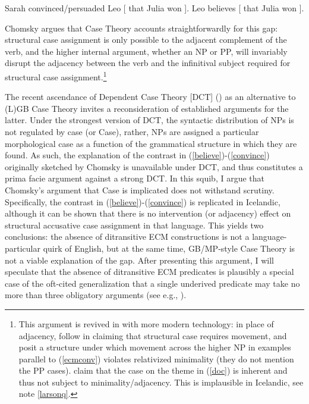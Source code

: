 \documentclass[output=paper]{LSP/langsci}
\begin{document}
\begin{exe}
\ex Sarah convinced/persuaded Leo [ that Julia won ]. \label{convleo}
\ex Leo believes [ that Julia won ]. \label{leobel}
\end{exe}

Chomsky argues that Case Theory accounts straightforwardly for this gap: structural case assignment is only possible to the adjacent complement of the verb, and the higher internal argument, whether an NP or PP, will invariably disrupt the adjacency between the verb and the infinitival subject required for structural case assignment.\footnote{This argument is revived in  \cite{boehorn05} with more modern technology: in place of adjacency, \cite{boehorn05} follow \cite{boskovic02} in claiming that structural case requires movement, and posit a structure under which movement across the higher NP in examples parallel to (\ref{ecmconv}) violates relativized minimality (they do not mention the PP cases). \cite{boehorn05} claim that the case on the theme in (\ref{doc}) is inherent and thus not subject to minimality/adjacency. This is implausible in Icelandic, see note \ref{larsonq}.} 

The recent ascendance of Dependent Case Theory [DCT] (\citealt{marantz91,baker15}) as an alternative to (L)GB Case Theory invites a reconsideration of established arguments for the latter. Under the strongest version of DCT, the syntactic distribution of NPs is not regulated by case (or Case), rather, NPs are assigned a particular morphological case as a function of the grammatical structure in which they are found. As such, the explanation of the contrast in (\ref{believe})-(\ref{convince}) originally sketched by Chomsky is unavailable under DCT, and thus constitutes a prima facie argument against a strong DCT. In this squib, I argue that Chomsky's argument that Case is implicated does not withstand scrutiny. Specifically, the contrast in (\ref{believe})-(\ref{convince}) is replicated in Icelandic, although it can be shown that there is no intervention (or adjacency) effect on structural accusative case assignment in that language. This yields two conclusions: the absence of ditransitive ECM constructions is not a language-particular quirk of English, but at the same time, GB/MP-style Case Theory is not a viable explanation of the gap. After presenting this argument, I will speculate that the absence of ditransitive ECM predicates is plausibly a special case of the oft-cited generalization that a single underived predicate may take no more than three obligatory arguments (see e.g., \citealt{pesetsky95}).
\end{document}
